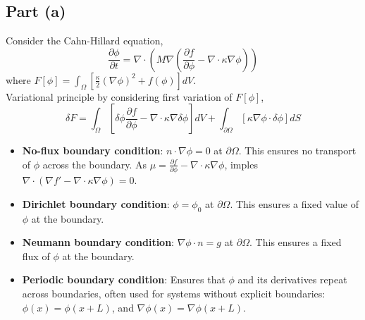 \documentclass[12pt]{article}
\begin{document}
\subsection*{Part (a)}
Consider the Cahn-Hillard equation,
\begin{equation*}
    \frac{\partial \phi}{\partial t} = \nabla \cdot (M \nabla (\frac{\partial f}{\partial \phi} - \nabla \cdot \kappa \nabla \phi))
\end{equation*}
where $F[\phi] = \int_{\Omega} [\frac{\kappa}{2} (\nabla \phi)^2 + f(\phi)] dV$.\\
Variational principle by considering first variation of $F[\phi]$,
\begin{equation*}
    \delta F = \int_{\Omega} [\delta \phi \frac{\partial f}{\partial \phi} - \nabla \cdot \kappa \nabla \delta \phi] dV + \int_{\partial \Omega} [\kappa \nabla \phi \cdot \delta \phi] dS
\end{equation*}
\begin{itemize}
    \item \textbf{No-flux boundary condition}: $n \cdot \nabla \phi = 0$ at $\partial \Omega$. This ensures no transport of $\phi$ across the boundary. As $\mu = \frac{\partial f}{\partial \phi} - \nabla \cdot \kappa \nabla \phi$, imples $\nabla \cdot (\nabla f' - \nabla \cdot \kappa \nabla \phi) = 0$.
    \item \textbf{Dirichlet boundary condition}: $\phi = \phi_0$ at $\partial \Omega$. This ensures a fixed value of $\phi$ at the boundary.
    \item \textbf{Neumann boundary condition}: $\nabla \phi \cdot n = g$ at $\partial \Omega$. This ensures a fixed flux of $\phi$ at the boundary.
    \item \textbf{Periodic boundary condition}: Ensures that $\phi$ and its derivatives repeat across boundaries, often used for systems without explicit boundaries: $\phi(x) = \phi(x + L)$, and $\nabla \phi(x) = \nabla \phi(x + L)$.
\end{itemize}\
\end{document}
